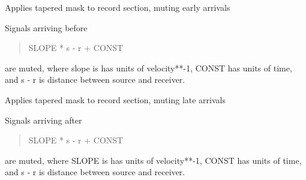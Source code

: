 \documentclass[letterpaper,10pt,english]{sphinxmanual}
\begin{document}

\begin{fulllineitems}
\label{\detokenize{ref/seisflows.tools:seisflows.tools.signal.mute_early_arrivals}}
Applies tapered mask to record section, muting early arrivals

Signals arriving before
\begin{quote}

SLOPE * \textbar{}\textbar{} s - r \textbar{}\textbar{} + CONST
\end{quote}

are muted, where slope is has units of velocity**-1,
CONST has units of time, and
\textbar{}\textbar{} s - r \textbar{}\textbar{} is distance between source and receiver.

\end{fulllineitems}


\begin{fulllineitems}
\label{\detokenize{ref/seisflows.tools:seisflows.tools.signal.mute_late_arrivals}}
Applies tapered mask to record section, muting late arrivals

Signals arriving after
\begin{quote}

SLOPE * \textbar{}\textbar{} s - r \textbar{}\textbar{} + CONST
\end{quote}

are muted, where SLOPE is has units of velocity**-1,
CONST has units of time, and
\textbar{}\textbar{} s - r \textbar{}\textbar{} is distance between source and receiver.

\end{fulllineitems}

\end{document}
